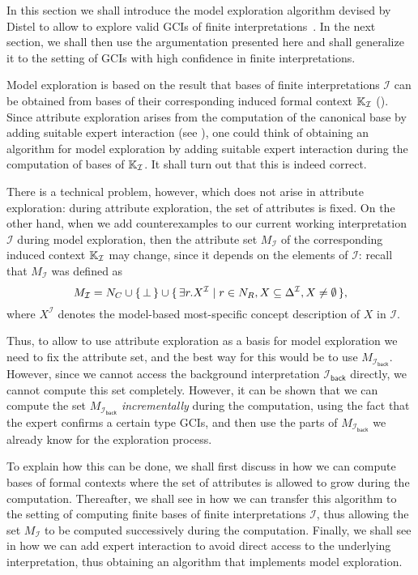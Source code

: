 In this section we shall introduce the model exploration algorithm devised by Distel to
allow to explore valid GCIs of finite interpretations~\cite[Chapter~6]{Diss-Felix}.  In
the next section, we shall then use the argumentation presented here and shall generalize
it to the setting of GCIs with high confidence in finite interpretations.

Model exploration is based on the result that bases of finite interpretations
$\mathcal{I}$ can be obtained from bases of their corresponding induced formal context
${\mathbb{K}}_{\mathcal{I}}$ ().  Since attribute exploration arises
from the computation of the canonical base by adding suitable expert interaction (see
), one could think of obtaining an algorithm for model exploration by
adding suitable expert interaction during the computation of bases of ${\mathbb{K}}_{\mathcal{I}}$.  It shall turn out that this is indeed correct.

There is a technical problem, however, which does not arise in attribute exploration:
during attribute exploration, the set of attributes is fixed.  On the other hand, when we
add counterexamples to our current working interpretation $\mathcal{I}$ during model
exploration, then the attribute set $M_{\mathcal{I}}$ of the corresponding induced context
${\mathbb{K}}_{\mathcal{I}}$ may change, since it depends on the elements of $\mathcal{I}$:
recall that $M_{\mathcal{I}}$ was defined as
\begin{equation*}
  M_{\mathcal{I}} = N_{C} \cup {\ensuremath{\{\, \bot \,\}}} \cup {\ensuremath{\{\, \exists r. X^{\mathcal{I}} \mid r
    \in N_{R}, X \subseteq \Delta^{\mathcal{I}}, X \neq \emptyset \,\}}},
\end{equation*}
where $X^{\mathcal{I}}$ denotes the model-based most-specific concept description of $X$
in $\mathcal{I}$.

Thus, to allow to use attribute exploration as a basis for model exploration we need to
fix the attribute set, and the best way for this would be to use
$M_{\mathcal{I}_{\mathsf{back}}}$.  However, since we cannot access the background
interpretation $\mathcal{I}_{\mathsf{back}}$ directly, we cannot compute this set
completely.  However, it can be shown that we can compute the set
$M_{\mathcal{I}_{\mathsf{back}}}$ \emph{incrementally} during the computation, using the
fact that the expert confirms a certain type GCIs, and then use the parts of
$M_{\mathcal{I}_{\mathsf{back}}}$ we already know for the exploration process.

To explain how this can be done, we shall first discuss in  how
we can compute bases of formal contexts where the set of attributes is allowed to grow
during the computation.  Thereafter, we shall see in  how we
can transfer this algorithm to the setting of computing finite bases of finite
interpretations $\mathcal{I}$, thus allowing the set $M_{\mathcal{I}}$ to be computed
successively during the computation.  Finally, we shall see in 
how we can add expert interaction to avoid direct access to the underlying interpretation,
thus obtaining an algorithm that implements model exploration.

